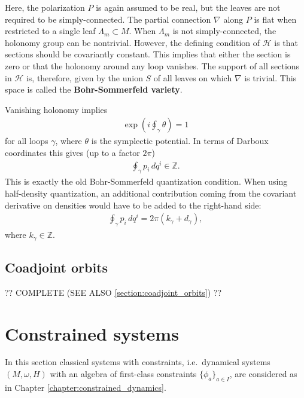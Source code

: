     \begin{method}
        Here, the polarization $P$ is again assumed to be real, but the leaves are not required to be simply-connected. The partial connection $\nabla$ along $P$ is flat when restricted to a single leaf $\Lambda_m\subset M$. When $\Lambda_m$ is not simply-connected, the holonomy group can be nontrivial. However, the defining condition of $\mathcal{H}$ is that sections should be covariantly constant. This implies that either the section is zero or that the holonomy around any loop vanishes. The support of all sections in $\mathcal{H}$ is, therefore, given by the union $S$ of all leaves on which $\nabla$ is trivial. This space is called the \textbf{Bohr-Sommerfeld variety}.

        Vanishing holonomy implies
        \begin{gather}
            \exp\left(i\oint_\gamma\theta\right) = 1
        \end{gather}
        for all loops $\gamma$, where $\theta$ is the symplectic potential. In terms of Darboux coordinates this gives (up to a factor $2\pi$)
        \begin{gather}
            \oint_\gamma p_i\,dq^i\in\mathbb{Z}.
        \end{gather}
        This is exactly the old Bohr-Sommerfeld quantization condition. When using half-density quantization, an additional contribution coming from the covariant derivative on densities would have to be added to the right-hand side:
        \begin{gather}
            \oint_\gamma p_i\,dq^i = 2\pi(k_\gamma + d_\gamma),
        \end{gather}
        where $k_\gamma\in\mathbb{Z}$.
    \end{method}

\subsection{Coadjoint orbits}

    ?? COMPLETE (SEE ALSO \ref{section:coadjoint_orbits}) ??

\section{Constrained systems}\label{section:quantum_constrained}

    In this section classical systems with constraints, i.e.~dynamical systems $(M,\omega,H)$ with an algebra of first-class constraints $\{\phi_a\}_{a\in I}$, are considered as in Chapter \ref{chapter:constrained_dynamics}.

